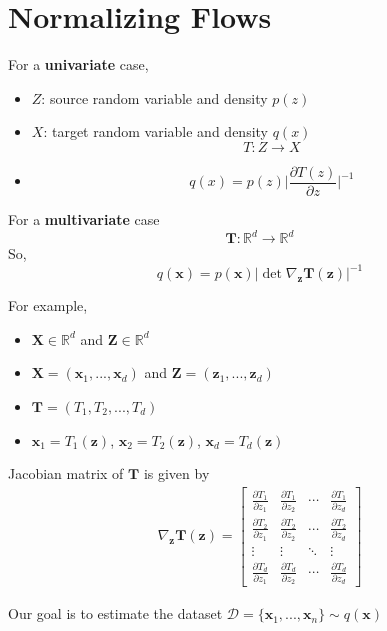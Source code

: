 \section{Normalizing Flows}


For a \textbf{univariate} case, 
\begin{itemize}
    \item $Z$: source random variable and density $p(z)$
    \item $X$: target random variable and density $q(x)$
    $$T: Z\rightarrow X$$
    \item  
    $$q(x) = p(z)\Big|\frac{\partial T(z)}{\partial z}\Big|^{-1}$$
\end{itemize}

For a \textbf{multivariate} case
$$\mathbf{T}: \mathbb{R}^d \rightarrow \mathbb{R}^d$$
So, 
$$q(\mathbf{x})= p(\mathbf{x})|\det \nabla_{\mathbf{z}}\mathbf{T}(\mathbf{z})|^{-1}$$

For example,
\begin{itemize}
    \item  $\mathbf{X}\in \mathbb{R}^d$ and $\mathbf{Z}\in \mathbb{R}^d$
    \item  $\mathbf{X} = (\mathbf{x}_1, ..., \mathbf{x}_d)$ and $\mathbf{Z} = (\mathbf{z}_1, ..., \mathbf{z}_d)$
    \item $\mathbf{T} = (T_1, T_2,...,T_d)$
    \item $\mathbf{x}_1 = T_1(\mathbf{z})$, $\mathbf{x}_2 = T_2(\mathbf{z})$, $\mathbf{x}_d = T_d(\mathbf{z})$
\end{itemize}

Jacobian matrix of $\mathbf{T}$ is given by
\begin{align*}
 \nabla_{\mathbf{z}}\mathbf{T}(\mathbf{z})  = \begin{bmatrix}
    \frac{\partial T_1}{\partial z_1} &\frac{\partial T_1}{\partial z_2} &\cdots &\frac{\partial T_1}{\partial z_d} \\
    \frac{\partial T_2}{\partial z_1} &\frac{\partial T_2}{\partial z_2} &\cdots &\frac{\partial T_2}{\partial z_d} \\
    \vdots& \vdots &\ddots &\vdots\\
    \frac{\partial T_d}{\partial z_1} &\frac{\partial T_d}{\partial z_2} &\cdots &\frac{\partial T_d}{\partial z_d} 
 \end{bmatrix}
\end{align*}

Our goal is to estimate the dataset $\mathcal{D} = \{\mathbf{x}_1, ..., \mathbf{x}_n\}\sim q(\mathbf{x})$

